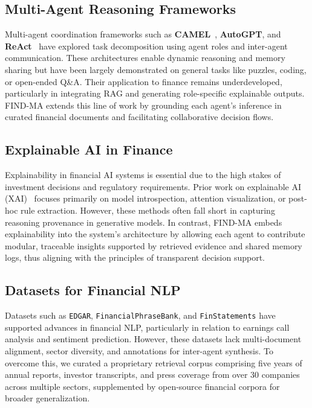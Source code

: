 \documentclass[11pt]{article}
\begin{document}
\subsection*{Multi-Agent Reasoning Frameworks}

Multi-agent coordination frameworks such as \textbf{CAMEL}~\cite{li2023camel}, \textbf{AutoGPT}, and \textbf{ReAct}~\cite{yao2023react} have explored task decomposition using agent roles and inter-agent communication. These architectures enable dynamic reasoning and memory sharing but have been largely demonstrated on general tasks like puzzles, coding, or open-ended Q\&A. Their application to finance remains underdeveloped, particularly in integrating RAG and generating role-specific explainable outputs. FIND-MA extends this line of work by grounding each agent’s inference in curated financial documents and facilitating collaborative decision flows.

\subsection*{Explainable AI in Finance}

Explainability in financial AI systems is essential due to the high stakes of investment decisions and regulatory requirements. Prior work on explainable AI (XAI)~\cite{arrieta2020explainable} focuses primarily on model introspection, attention visualization, or post-hoc rule extraction. However, these methods often fall short in capturing reasoning provenance in generative models. In contrast, FIND-MA embeds explainability into the system’s architecture by allowing each agent to contribute modular, traceable insights supported by retrieved evidence and shared memory logs, thus aligning with the principles of transparent decision support.

\subsection*{Datasets for Financial NLP}

Datasets such as \texttt{EDGAR}, \texttt{FinancialPhraseBank}, and \texttt{FinStatements} have supported advances in financial NLP, particularly in relation to earnings call analysis and sentiment prediction. However, these datasets lack multi-document alignment, sector diversity, and annotations for inter-agent synthesis. To overcome this, we curated a proprietary retrieval corpus comprising five years of annual reports, investor transcripts, and press coverage from over 30 companies across multiple sectors, supplemented by open-source financial corpora for broader generalization.
\end{document}
